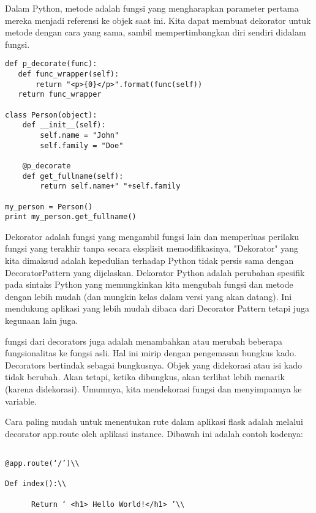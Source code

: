 \documentclass[12pt,a4paper]{article}
\begin{document}
Dalam Python, metode adalah fungsi yang mengharapkan parameter pertama mereka menjadi referensi ke objek saat ini. Kita dapat membuat dekorator untuk metode dengan cara yang sama, sambil mempertimbangkan diri sendiri didalam fungsi.

\begin{verbatim}
def p_decorate(func):
   def func_wrapper(self):
       return "<p>{0}</p>".format(func(self))
   return func_wrapper

class Person(object):
    def __init__(self):
        self.name = "John"
        self.family = "Doe"

    @p_decorate
    def get_fullname(self):
        return self.name+" "+self.family

my_person = Person()
print my_person.get_fullname()

\end{verbatim}

Dekorator adalah fungsi yang mengambil fungsi lain dan memperluas perilaku fungsi yang terakhir tanpa secara eksplisit memodifikasinya, "Dekorator" yang kita dimaksud adalah kepedulian terhadap Python tidak persis sama dengan DecoratorPattern yang dijelaskan. Dekorator Python adalah perubahan spesifik pada sintaks Python yang memungkinkan kita mengubah fungsi dan metode dengan lebih mudah (dan mungkin kelas dalam versi yang akan datang). Ini mendukung aplikasi yang lebih mudah dibaca dari Decorator Pattern tetapi juga kegunaan lain juga.



fungsi dari decorators juga adalah menambahkan atau merubah beberapa fungsionalitas ke fungsi asli. Hal ini mirip dengan pengemasan bungkus kado. Decorators bertindak sebagai bungkusnya. Objek yang didekorasi atau isi kado tidak berubah. Akan tetapi, ketika dibungkus, akan terlihat lebih menarik (karena didekorasi). Umumnya, kita mendekorasi fungsi dan menyimpannya ke variable.



Cara paling mudah untuk menentukan rute dalam aplikasi flask adalah melalui decorator app.route oleh aplikasi instance. Dibawah ini adalah contoh kodenya:\\

\begin{verbatim}

@app.route(‘/’)\\

Def index():\\

      Return ‘ <h1> Hello World!</h1> ’\\

\end{verbatim}
\end{document}

